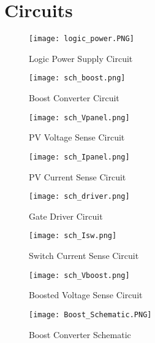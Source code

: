 
\chapter{Circuits} %

\label{AppendixB} %


\begin{figure}[ht]
\centering
\texttt{[image: logic\_power.PNG]}
\caption{Logic Power Supply Circuit}
\label{logic power fig}
\end{figure}


\begin{figure}[hb]
\centering
\texttt{[image: sch\_boost.png]}
\caption{Boost Converter Circuit}
\label{boostConverterCircuit}
\end{figure}

\begin{figure}[ht]
\centering
\texttt{[image: sch\_Vpanel.png]}
\caption{PV Voltage Sense Circuit}
\label{VpvSenseCircuit}
\end{figure}

\begin{figure}[hb]
\centering
\texttt{[image: sch\_Ipanel.png]}
\caption{PV Current Sense Circuit}
\label{IpvSenseCircuit}
\end{figure}

\begin{figure}[ht]
\centering
\texttt{[image: sch\_driver.png]}
\caption{ Gate Driver Circuit}
\label{gateDriverCircuit}
\end{figure}

\begin{figure}[hb]
\centering
\texttt{[image: sch\_Isw.png]}
\caption{Switch Current Sense Circuit}
\label{IswSenseCircuit}
\end{figure}

\begin{figure}[ht]
\centering
\texttt{[image: sch\_Vboost.png]}
\caption{Boosted Voltage Sense Circuit}
\label{VboostSenseCircuit}
\end{figure}

\begin{figure}[hb]
\centering
\texttt{[image: Boost\_Schematic.PNG]}
\caption{Boost Converter Schematic}
\label{boostCompleteSchematic}
\end{figure}

